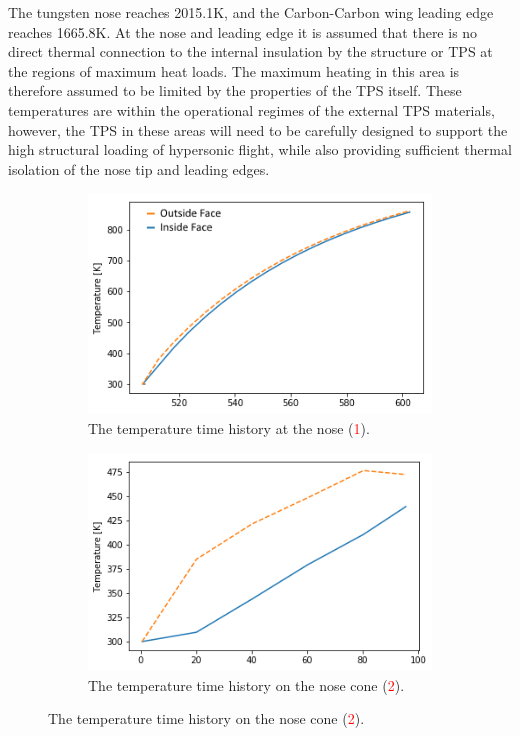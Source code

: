 The tungsten nose reaches 2015.1K, and the Carbon-Carbon wing leading edge reaches 1665.8K. 
At the nose and leading edge it is assumed that there is no direct thermal connection to the internal insulation by the structure or TPS at the regions of maximum heat loads. The maximum heating in this area is therefore assumed to be limited by the properties of the TPS itself. These temperatures are within the operational regimes of the external TPS materials, however, the TPS in these areas will need to be carefully designed to support the high structural loading of hypersonic flight, while also providing sufficient thermal isolation of the nose tip and leading edges.


\begin{figure}[!ht]
	\begin{subfigure}{.495\textwidth}
		\centering
		\includegraphics[width=0.99\linewidth]{figures/A1_uncertainty-analysis/TNose3}
		\caption{The temperature time history at the nose (\textcolor{red}{1}).}
		
	\end{subfigure}
	
	\begin{subfigure}{.495\textwidth}
		\centering
		\includegraphics[width=0.99\linewidth]{figures/A1_uncertainty-analysis/T3onNose}
		\caption{The temperature time history on the nose cone (\textcolor{red}{2}).}
		

\end{subfigure}
\end{figure}
